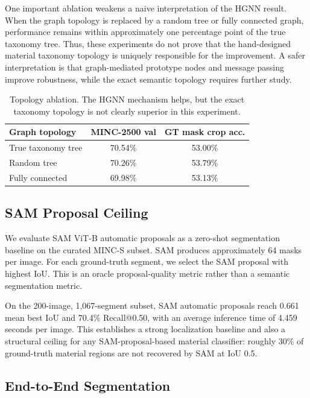 \documentclass[11pt,twocolumn,letterpaper]{article}
\begin{document}
One important ablation weakens a naive interpretation of the HGNN result. When the graph topology is replaced by a random tree or fully connected graph, performance remains within approximately one percentage point of the true taxonomy tree. Thus, these experiments do not prove that the hand-designed material taxonomy topology is uniquely responsible for the improvement. A safer interpretation is that graph-mediated prototype nodes and message passing improve robustness, while the exact semantic topology requires further study.

\begin{table}[t]
\centering
\small
\begin{tabular}{lcc}
\toprule
Graph topology & MINC-2500 val & GT mask crop acc. \\
\midrule
True taxonomy tree & 70.54\% & 53.00\% \\
Random tree & 70.26\% & 53.79\% \\
Fully connected & 69.98\% & 53.13\% \\
\bottomrule
\end{tabular}
\caption{Topology ablation. The HGNN mechanism helps, but the exact taxonomy topology is not clearly superior in this experiment.}
\label{tab:topology_ablation}
\end{table}

\subsection{SAM Proposal Ceiling}

We evaluate SAM ViT-B automatic proposals as a zero-shot segmentation baseline on the curated MINC-S subset. SAM produces approximately 64 masks per image. For each ground-truth segment, we select the SAM proposal with highest IoU. This is an oracle proposal-quality metric rather than a semantic segmentation metric.

On the 200-image, 1,067-segment subset, SAM automatic proposals reach 0.661 mean best IoU and 70.4\% Recall@0.50, with an average inference time of 4.459 seconds per image. This establishes a strong localization baseline and also a structural ceiling for any SAM-proposal-based material classifier: roughly 30\% of ground-truth material regions are not recovered by SAM at IoU 0.5.

\subsection{End-to-End Segmentation}
\end{document}

